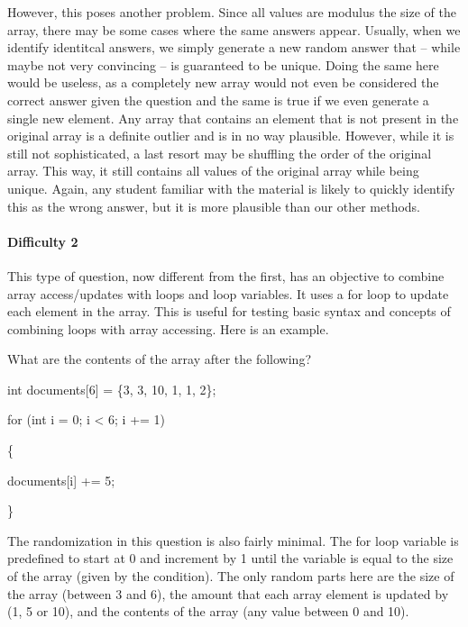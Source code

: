 \documentclass{article}
\begin{document}
However, this poses another problem. Since all values are modulus the size of the array, there may be some cases where the same answers appear. Usually, when we identify identitcal answers,
we simply generate a new random answer that -- while maybe not very convincing -- is guaranteed to be unique. Doing the same here would be useless, as a completely new array would not
even be considered the correct answer given the question and the same is true if we even generate a single new element. Any array that contains an element that is not present in the 
original array is a definite outlier and is in no way plausible. However, while it is still not sophisticated, a last resort may be shuffling the order of the original array. This way, it still contains all
values of the original array while being unique. Again, any student familiar with the material is likely to quickly identify this as the wrong answer, but it is more plausible than our other methods.

\paragraph{Difficulty 2} \hfill \par

This type of question, now different from the first, has an objective to combine array access/updates with loops and loop variables. It uses a for loop to update each element in the array. This is
useful for testing basic syntax and concepts of combining loops with array accessing. Here is an example. 

\hfill \par
What are the contents of the array after the following?\par
int documents[6] = \{3, 3, 10, 1, 1, 2\};\par
for (int i = 0; i \textless{} 6; i += 1)\par
\{ \par
\indent\indent documents[i] += 5; \par
\} \par
\hfill \par

The randomization in this question is also fairly minimal. The for loop variable is predefined to start at 0 and increment by 1 until the variable is equal to the size of the array (given by the 
condition). The only random parts here are the size of the array (between 3 and 6), the amount that each array element is updated by (1, 5 or 10), and the contents of the array (any value 
between 0 and 10). 
\end{document}
